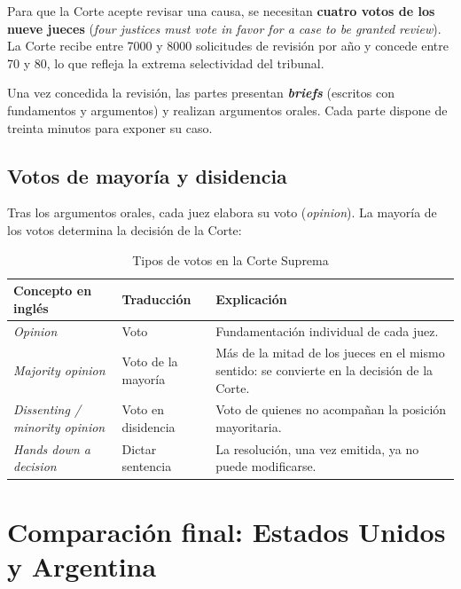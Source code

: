 \documentclass[12pt,oneside]{book}
\begin{document}
Para que la Corte acepte revisar una causa, se necesitan \textbf{cuatro votos de los nueve jueces} (\textit{four justices must vote in favor for a case to be granted review}). La Corte recibe entre 7000 y 8000 solicitudes de revisión por año y concede entre 70 y 80, lo que refleja la extrema selectividad del tribunal.

Una vez concedida la revisión, las partes presentan \textbf{\textit{briefs}} (escritos con fundamentos y argumentos) y realizan argumentos orales. Cada parte dispone de treinta minutos para exponer su caso.

\subsection{Votos de mayoría y disidencia}

Tras los argumentos orales, cada juez elabora su voto (\textit{opinion}). La mayoría de los votos determina la decisión de la Corte:

\begin{table}[H]
\centering
\caption{Tipos de votos en la Corte Suprema}
\begin{tabularx}{\textwidth}{>{\raggedright\arraybackslash}p{} >{\raggedright\arraybackslash}p{} >{\raggedright\arraybackslash}X}
\toprule
\textbf{Concepto en inglés} & \textbf{Traducción} & \textbf{Explicación} \\
\midrule
\textit{Opinion} & Voto & Fundamentación individual de cada juez. \\
\textit{Majority opinion} & Voto de la mayoría & Más de la mitad de los jueces en el mismo sentido: se convierte en la decisión de la Corte. \\
\textit{Dissenting / minority opinion} & Voto en disidencia & Voto de quienes no acompañan la posición mayoritaria. \\
\textit{Hands down a decision} & Dictar sentencia & La resolución, una vez emitida, ya no puede modificarse. \\
\bottomrule
\end{tabularx}
\end{table}

\section{Comparación final: Estados Unidos y Argentina}
\end{document}
